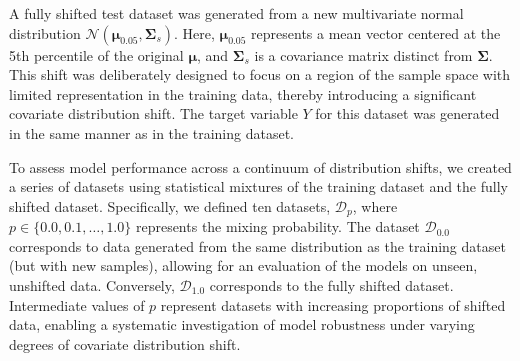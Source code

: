A fully shifted test dataset was generated from a new multivariate normal distribution $\mathcal{N}(\boldsymbol{\mu}_{0.05}, \boldsymbol{\Sigma}_s)$. Here, $\boldsymbol{\mu}_{0.05}$ represents a mean vector centered at the 5th percentile of the original $\boldsymbol{\mu}$, and $\boldsymbol{\Sigma}_s$ is a covariance matrix distinct from $\boldsymbol{\Sigma}$. This shift was deliberately designed to focus on a region of the sample space with limited representation in the training data, thereby introducing a significant covariate distribution shift. The target variable $Y$ for this dataset was generated in the same manner as in the training dataset.

To assess model performance across a continuum of distribution shifts, we created a series of datasets using statistical mixtures of the training dataset and the fully shifted dataset. Specifically, we defined ten datasets, $\mathcal{D}_p$, where $p \in \{0.0, 0.1, \ldots, 1.0\}$ represents the mixing probability. The dataset $\mathcal{D}_{0.0}$ corresponds to data generated from the same distribution as the training dataset (but with new samples), allowing for an evaluation of the models on unseen, unshifted data. Conversely, $\mathcal{D}_{1.0}$ corresponds to the fully shifted dataset. Intermediate values of $p$ represent datasets with increasing proportions of shifted data, enabling a systematic investigation of model robustness under varying degrees of covariate distribution shift.
